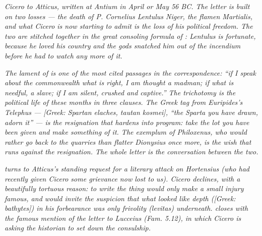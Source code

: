 
\textit{Cicero to Atticus, written at Antium in April or May
56 BC. The letter is built on two losses --- the death of
P. Cornelius Lentulus Niger, the flamen Martialis, and what
Cicero is now starting to admit is the loss of his political
freedom. The two are stitched together in the great consoling
formula of : Lentulus is fortunate, because he
loved his country and the gods snatched him out of the
\textit{incendium} before he had to watch any more of it.}

\textit{The lament of  is one of the most cited
passages in the correspondence: ``if I speak about the
commonwealth what is right, I am thought a madman; if what is
needful, a slave; if I am silent, crushed and captive.'' The
trichotomy is the political life of these months in three
clauses. The Greek tag from Euripides's \textit{Telephus} ---
\textit{[Greek: Spartan elaches, tautan kosmei]}, ``the Sparta
you have drawn, adorn it'' --- is the resignation that hardens
into program: take the lot you have been given and make
something of it. The exemplum of Philoxenus, who would rather
go back to the quarries than flatter Dionysius once more, is
the wish that runs against the resignation. The whole letter
is the conversation between the two.}

\textit{ turns to Atticus's standing request for
a literary attack on Hortensius (who had recently given Cicero
some grievance now lost to us). Cicero declines, with a
beautifully tortuous reason: to write the thing would only
make a small injury famous, and would invite the suspicion
that what looked like depth (\textit{[Greek: bathytes]}) in his
forbearance was only frivolity (\textit{levitas}) underneath.
 closes with the famous mention of the letter
to Lucceius (\textit{Fam.} 5.12), in which Cicero is asking
the historian to set down the consulship.}
